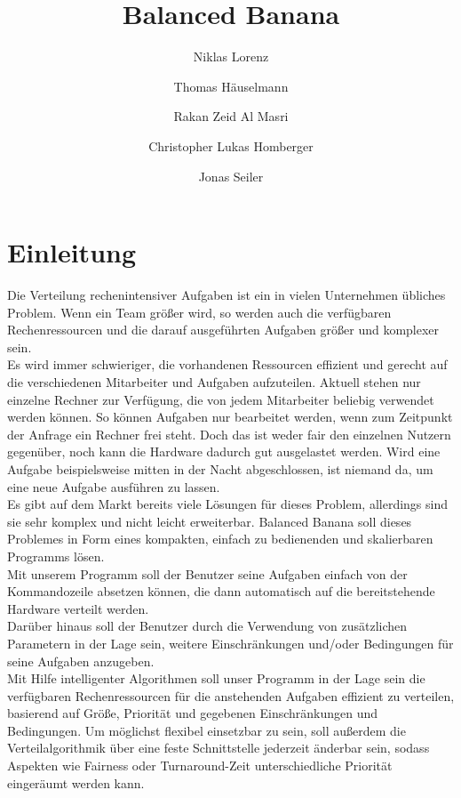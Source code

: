 \documentclass[a4paper,12pt]{article}
\title{Balanced Banana}
\author{Niklas Lorenz \and Thomas Häuselmann \and Rakan Zeid Al Masri \and Christopher Lukas Homberger \and Jonas Seiler}
\begin{document}
\setcounter{page}{2}
\tableofcontents          %
\clearpage
{}

\section{Einleitung}
\vspace*{1cm}

Die Verteilung rechenintensiver Aufgaben ist ein in vielen Unternehmen übliches Problem. Wenn ein Team größer wird, 
so werden auch die verfügbaren Rechenressourcen und die darauf ausgeführten Aufgaben größer und komplexer sein.\\


Es wird immer schwieriger, die vorhandenen Ressourcen effizient und gerecht auf die verschiedenen Mitarbeiter und Aufgaben aufzuteilen.
Aktuell stehen nur einzelne Rechner zur Verfügung, die von jedem Mitarbeiter beliebig verwendet werden können. So können Aufgaben nur bearbeitet werden,
wenn zum Zeitpunkt der Anfrage ein Rechner frei steht. Doch das ist weder fair den einzelnen Nutzern gegenüber, noch kann die Hardware dadurch gut ausgelastet werden. Wird eine Aufgabe beispielsweise mitten in der Nacht abgeschlossen, ist niemand da, um eine neue Aufgabe ausführen zu lassen. \\


Es gibt auf dem Markt bereits viele Lösungen für dieses Problem, allerdings sind sie sehr komplex und nicht leicht erweiterbar.
Balanced Banana soll dieses Problemes in Form eines kompakten, einfach zu bedienenden und skalierbaren Programms lösen. \\

Mit unserem Programm soll der Benutzer seine Aufgaben einfach von der Kommandozeile absetzen können, die dann automatisch auf die bereitstehende Hardware verteilt werden. \\

Darüber hinaus soll der Benutzer durch die Verwendung von zusätzlichen Parametern in der Lage sein, weitere Einschränkungen und/oder Bedingungen für seine Aufgaben anzugeben.\\

Mit Hilfe intelligenter Algorithmen soll unser Programm in der Lage sein die verfügbaren Rechenressourcen für die anstehenden Aufgaben effizient zu verteilen,
basierend auf Größe, Priorität und gegebenen Einschränkungen und Bedingungen. Um möglichst flexibel einsetzbar zu sein, soll außerdem die Verteilalgorithmik
über eine feste Schnittstelle jederzeit änderbar sein, sodass Aspekten wie Fairness oder Turnaround-Zeit unterschiedliche Priorität eingeräumt werden kann.
\end{document}
